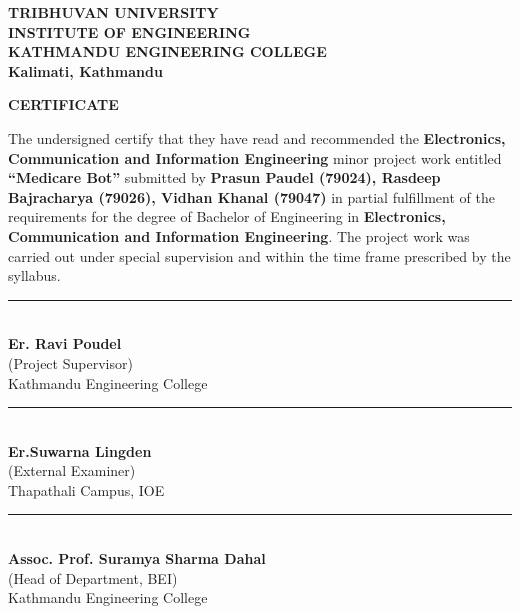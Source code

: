 \thispagestyle{empty}

\begin{center}

\textbf{\Large TRIBHUVAN UNIVERSITY}\\[0.3cm]
\textbf{\Large INSTITUTE OF ENGINEERING}\\[0.3cm]
\textbf{\Large KATHMANDU ENGINEERING COLLEGE}\\[0.2cm]
\textbf{Kalimati, Kathmandu}

\vspace{1.5cm}

\textbf{\Large CERTIFICATE}

\end{center}

\vspace{1cm}

\noindent
The undersigned certify that they have read and recommended the 
\textbf{Electronics, Communication and Information Engineering} minor project work entitled 
\textbf{“Medicare Bot”} submitted by 
\textbf{Prasun Paudel (79024), Rasdeep Bajracharya (79026), Vidhan Khanal (79047)} 
in partial fulfillment of the requirements for the degree of Bachelor of Engineering in 
\textbf{Electronics, Communication and Information Engineering}. 
The project work was carried out under special supervision and within the time frame prescribed by the syllabus.

\vspace{2.5cm}

\begin{center}
\rule{6cm}{0.4pt}\\
\textbf{Er. Ravi Poudel}\\
(Project Supervisor)\\
Kathmandu Engineering College
\end{center}

\vspace{2cm}

\noindent
\begin{minipage}{0.45\textwidth}
\centering
\rule{6cm}{0.4pt}\\
\textbf{Er.Suwarna Lingden}\\
(External Examiner)\\
Thapathali Campus, IOE
\end{minipage}
\hfill
\begin{minipage}{0.45\textwidth}
\centering
\rule{6cm}{0.4pt}\\
\textbf{Assoc. Prof. Suramya Sharma Dahal}\\
(Head of Department, BEI)\\
Kathmandu Engineering College
\end{minipage}